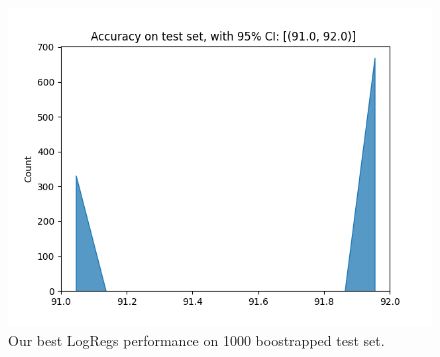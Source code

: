 
\begin{figure}[H]
    \centering
    \includegraphics[width=\linewidth]{results/evaluation/logreg_confidence.png}
    \caption{Our best LogRegs performance on 1000 boostrapped test set.}
    \label{fig:C}
\end{figure}